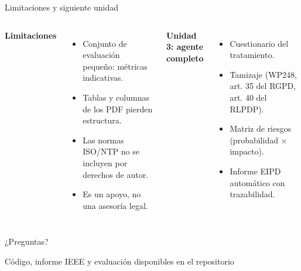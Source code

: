 \documentclass[aspectratio=169,10pt]{beamer}
\begin{document}
\begin{frame}{Limitaciones y siguiente unidad}
\begin{columns}[T]
\textbf{Limitaciones}
\begin{itemize}\small
  \item Conjunto de evaluación pequeño: métricas indicativas.
  \item Tablas y columnas de los PDF pierden estructura.
  \item Las normas ISO/NTP no se incluyen por derechos de autor.
  \item Es un apoyo, no una asesoría legal.
\end{itemize}
\textbf{Unidad 3: agente completo}
\begin{itemize}\small
  \item Cuestionario del tratamiento.
  \item Tamizaje (WP248, art. 35 del RGPD, art. 40 del RLPDP).
  \item Matriz de riesgos (probabilidad × impacto).
  \item Informe EIPD automático con trazabilidad.
\end{itemize}
\end{columns}
\end{frame}

\begin{frame}[standout]
¿Preguntas?

\vspace{4mm}\small Código, informe IEEE y evaluación disponibles en el repositorio
\end{frame}
\end{document}
